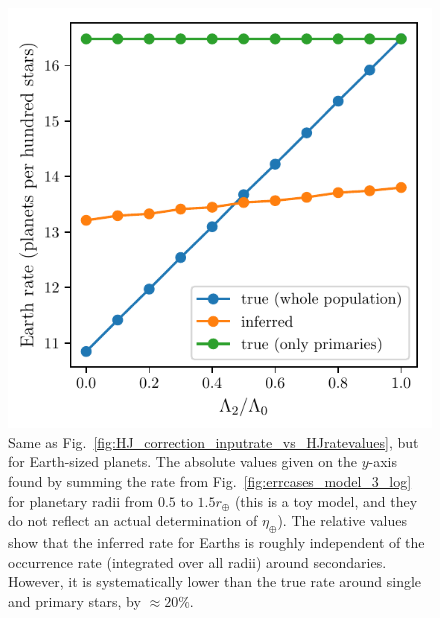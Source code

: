 \begin{figure}[!tb]
    \centering
    \includegraphics[width=.9\textwidth]{figures/earth_inputrate_vs_etaearthratevalues.pdf}
    \caption{
        Same as Fig.~\ref{fig:HJ_correction_inputrate_vs_HJratevalues}, but 
        for Earth-sized planets.
        The absolute values given on the $y$-axis found by summing the rate 
        from Fig.~\ref{fig:errcases_model_3_log} for planetary radii from 
        $0.5$ to $1.5r_\oplus$ (this is a toy model, and they do not reflect 
        an actual determination of $\eta_\oplus$).
        The relative values show that the inferred rate for Earths is roughly 
        independent of the occurrence rate (integrated over all radii) around 
        secondaries.
        However, it is systematically lower than the true rate around single 
        and primary stars, by $\approx 20\%$.
    }
    \label{fig:earth_inputrate_vs_etaearthratevalues}
\end{figure}


